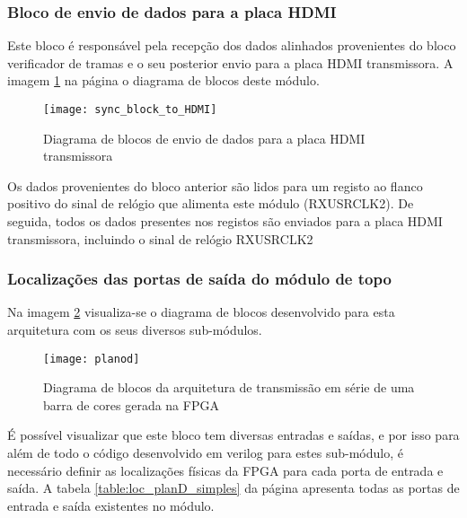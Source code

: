 \subsubsection*{Bloco de envio de dados para a placa HDMI} \label{subsub:serial_send signals to HDMI}

Este bloco é responsável pela recepção dos dados alinhados provenientes do bloco verificador de tramas e o seu posterior envio para a placa HDMI transmissora. A imagem \ref{fig:sync_block_to_HDMI} na página \pageref{fig:sync_block_to_HDMI} o diagrama de blocos deste módulo.

\begin{figure}[h!]
	\begin{center}
		\leavevmode
		\texttt{[image: sync\_block\_to\_HDMI]}
		\captionsetup{width=1.0\linewidth}
		\caption[Diagrama de blocos de envio de dados para a placa HDMI transmissora]{Diagrama de blocos de envio de dados para a placa HDMI transmissora}
		\label{fig:sync_block_to_HDMI}
	\end{center}
\end{figure}

Os dados provenientes do bloco anterior são lidos para um registo ao flanco positivo do sinal de relógio que alimenta este módulo (RXUSRCLK2). De seguida, todos os dados presentes nos registos são enviados para a placa HDMI transmissora, incluindo o sinal de relógio RXUSRCLK2

\subsubsection*{Localizações das portas de saída do módulo de topo} \label{subsub:serial_locs_planD}

Na imagem \ref{fig:planD} visualiza-se o diagrama de blocos desenvolvido para esta arquitetura com os seus diversos sub-módulos. 
\begin{figure}[h!]
	\begin{center}
		\leavevmode
		\texttt{[image: planod]}
		\captionsetup{width=1.0\linewidth}
		\caption[Diagrama de blocos da arquitetura de transmissão em série de uma barra de cores gerada na FPGA]{Diagrama de blocos da arquitetura de transmissão em série de uma barra de cores gerada na FPGA}
		\label{fig:planD}
	\end{center}
\end{figure}

É possível visualizar que este bloco tem diversas entradas e saídas, e por isso para além de todo o código desenvolvido em verilog para estes sub-módulo, é necessário definir as localizações físicas da FPGA para cada porta de entrada e saída. A tabela \ref{table:loc_planD_simples} da página \pageref{table:loc_planD_simples} apresenta todas as portas de entrada e saída existentes no módulo. 

